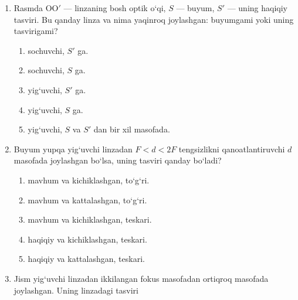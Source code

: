 \begin{enumerate}
\begin{enumerate}[label=\Alph*)]
\item mavhum, to‘g‘ri, kichraygan.
\item mavhum, teskari, kattalashgan.
\item haqiqiy, teskari, kattalashgan.
\item haqiqiy, to‘g‘ri, kichraygan.
\end{enumerate}

\item Rasmda OO$'$ — linzaning bosh optik o‘qi, $S$ — buyum, $S'$ — uning haqiqiy tasviri. Bu qanday linza va nima yaqinroq joylashgan: buyumgami yoki uning tasvirigami?


\begin{enumerate}[label=\Alph*)]
\item sochuvchi, $S'$ ga.
\item sochuvchi, $S$ ga.
\item yig‘uvchi, $S'$ ga.
\item yig‘uvchi, $S$ ga.
\item yig‘uvchi, $S$ va $S'$ dan bir xil masofada.
\end{enumerate}

\item Buyum yupqa yig‘uvchi linzadan $F<d<2F$ tengsizlikni qanoatlantiruvchi $d$ masofada joylashgan bo‘lsa, uning tasviri qanday bo‘ladi?

\begin{enumerate}[label=\Alph*)]
\item mavhum va kichiklashgan, to‘g‘ri.
\item mavhum va kattalashgan, to‘g‘ri.
\item mavhum va kichiklashgan, teskari.
\item haqiqiy va kichiklashgan, teskari.
\item haqiqiy va kattalashgan, teskari.
\end{enumerate}

\item Jism yig‘uvchi linzadan ikkilangan fokus masofadan ortiqroq masofada joylashgan. Uning linzadagi tasviri


\end{enumerate}

